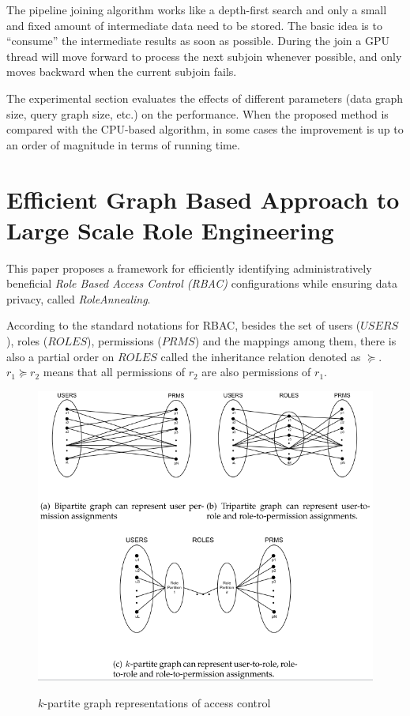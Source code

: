 \documentclass[paper=a4, fontsize=18pt]{article} %
\numberwithin{equation}{section} %
\numberwithin{figure}{section} %
\numberwithin{table}{section} %
\begin{document}
The pipeline joining algorithm works like a depth-first search and only a small and fixed amount of intermediate data need to be stored. The basic idea is to ``consume'' the intermediate results as soon as possible. During the join a GPU thread will move forward to process the next subjoin whenever possible, and only moves backward when the current subjoin fails.

The experimental section evaluates the effects of different parameters (data graph size, query graph size, etc.) on the performance. When the proposed method is compared with the CPU-based algorithm, in some cases the improvement is up to an order of magnitude in terms of running time.

\section{Efficient Graph Based Approach to Large Scale Role Engineering \cite{ZR0V14}}

This paper proposes a framework for efficiently identifying administratively beneficial \emph{Role Based Access Control (RBAC)} configurations while ensuring data privacy, called \emph{RoleAnnealing}.

According to the standard notations for RBAC, besides the set of users ($USERS$), roles ($ROLES$), permissions ($PRMS$) and the mappings among them, there is also a partial order on $ROLES$ called the inheritance relation denoted as $\succeq$. $r_1 \succeq r_2$ means that all permissions of $r_2$ are also permissions of $r_1$.

\begin{figure}[h]
  \centering
  \includegraphics[width=.8\linewidth]{8_1_partite.png}\\
  \caption{$k$-partite graph representations of access control}\label{fig:partite}
\end{figure}
\end{document}
